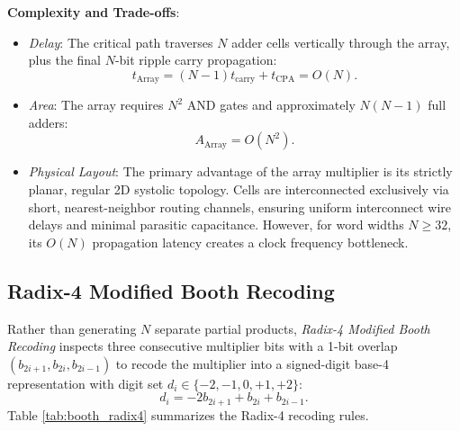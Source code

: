 \textbf{Complexity and Trade-offs}:
\begin{itemize}
    \item \textit{Delay}: The critical path traverses $N$ adder cells vertically through the array, plus the final $N$-bit ripple carry propagation:
    \begin{equation}
    t_{\text{Array}} = (N - 1) t_{\text{carry}} + t_{\text{CPA}} = O(N).
    \end{equation}
    
    \item \textit{Area}: The array requires $N^2$ AND gates and approximately $N(N - 1)$ full adders:
    \begin{equation}
    A_{\text{Array}} = O(N^2).
    \end{equation}
    
    \item \textit{Physical Layout}: The primary advantage of the array multiplier is its strictly planar, regular 2D systolic topology. Cells are interconnected exclusively via short, nearest-neighbor routing channels, ensuring uniform interconnect wire delays and minimal parasitic capacitance. However, for word widths $N \ge 32$, its $O(N)$ propagation latency creates a clock frequency bottleneck.
\end{itemize}

\subsection{Radix-4 Modified Booth Recoding}

Rather than generating $N$ separate partial products, \textit{Radix-4 Modified Booth Recoding} \cite{booth1951, macsorley1961} inspects three consecutive multiplier bits with a 1-bit overlap $(b_{2i+1}, b_{2i}, b_{2i-1})$ to recode the multiplier into a signed-digit base-4 representation with digit set $d_i \in \{-2, -1, 0, +1, +2\}$:
\begin{equation}
d_i = -2 b_{2i+1} + b_{2i} + b_{2i-1}.
\end{equation}
Table \ref{tab:booth_radix4} summarizes the Radix-4 recoding rules.

